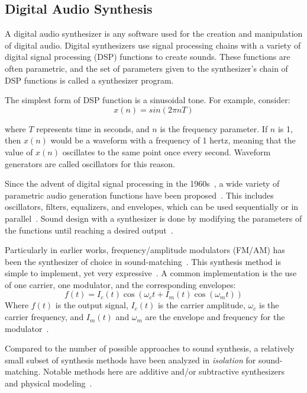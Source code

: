 \documentclass[lettersize,journal]{IEEEtran}
\providecommand{\gls}[1]{#1}
\begin{document}
\subsection{Digital Audio Synthesis}
\label{sec:dsp}
A digital audio synthesizer is any software used for the creation and manipulation of digital audio. Digital synthesizers use signal processing chains with a variety of digital signal processing (\gls{DSP}) functions to create sounds. These functions are often parametric, and the set of parameters given to the synthesizer's chain of DSP functions is called a synthesizer program.

The simplest form of DSP function is a sinusoidal tone. For example, consider:
\[ x(n) = sin( 2\pi n T)\]

where $T$ represents time in seconds, and $n$ is the frequency parameter. If $n$ is 1, then $x(n)$ would be a waveform with a frequency of 1 hertz, meaning that the value of $x(n)$ oscillates to the same point once every second. Waveform generators are called oscillators for this reason. 

Since the advent of digital signal processing in the 1960s~\cite{stranneby2004digital}, a wide variety of parametric audio generation functions have been proposed~\cite{lyons1997understanding,russ1999sound,shier2020spiegelib}. This includes oscillators, filters, equalizers, and envelopes, which can be used sequentially or in parallel~\cite{lyons1997understanding,russ1999sound}. Sound design with a synthesizer is done by modifying the parameters of the functions until reaching a desired output~\cite{roads1996computer,pinch2004analog}.

Particularly in earlier works, frequency/amplitude modulators (\gls{FM}/\gls{AM}) has been the synthesizer of choice in sound-matching~\cite{horner1993machine,mitchell2007evolutionary,vahidi2023mesostructures}. This synthesis method is simple to implement, yet very expressive~\cite{chowning1973synthesis}. A common implementation is the use of one carrier, one modulator, and the corresponding envelopes:
\[ f(t) = I_c(t) \cos(\omega_c t + I_m(t) \cos(\omega_m t))
\]
Where $f(t)$ is the output signal, $I_c(t)$ is the carrier amplitude, $\omega_c$ is the carrier frequency, and $I_m(t)$ and $\omega_m$ are the envelope and frequency for the modulator~\cite{justice1979analytic}. 

Compared to the number of possible approaches to sound synthesis, a relatively small subset of synthesis methods have been analyzed in \textit{isolation} for sound-matching. Notable methods here are additive and/or subtractive synthesizers~\cite{engel2020ddsp,masuda2023improving,salimi2020make} and physical modeling~\cite{riionheimo2003parameter,han2024learning}.
\end{document}
